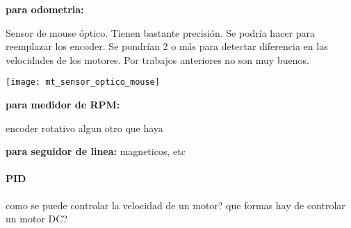 \textbf{para odometria:}

Sensor de mouse óptico. Tienen bastante precisión. Se podría hacer para reemplazar los encoder. Se pondrían 2 o más para detectar diferencia en las velocidades de los motores. Por trabajos anteriores no son muy buenos.

\begin{center}
    \texttt{[image: mt\_sensor\_optico\_mouse]}
\end{center}

\textbf{para medidor de RPM:}

encoder rotativo
algun otro que haya

\textbf{para seguidor de linea:}
magneticos, etc

\paragraph{PID}

como se puede controlar la velocidad de un motor?
que formas hay de controlar un motor DC?